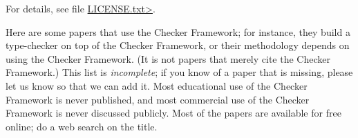\noindent
For details, see file
\href{https://raw.githubusercontent.com/eisop/checker-framework/master/LICENSE.txt}{\<LICENSE.txt>}.



Here are some papers that use the Checker Framework;
for instance, they build a type-checker on top of the Checker Framework, or
their methodology depends on using the Checker Framework.
(It is not papers that merely cite the Checker Framework.)
This list is \emph{incomplete}; if you know of a paper that
is missing, please let us know so that we can add it.
Most educational use of the Checker Framework is never published, and most
commercial use of the Checker Framework is never discussed publicly.
Most of the papers are available for free online; do a web search on the
title.

